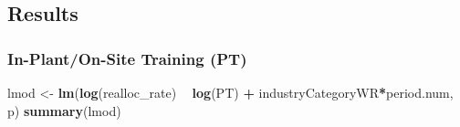 \documentclass[
]{article}
\newenvironment{Shaded}{\begin{snugshade}}{\end{snugshade}}
\newcommand{\KeywordTok}[1]{\textcolor[rgb]{0.13,0.29,0.53}{\textbf{#1}}}
\newcommand{\NormalTok}[1]{#1}
\newcommand{\OperatorTok}[1]{\textcolor[rgb]{0.81,0.36,0.00}{\textbf{#1}}}
\newcommand{\StringTok}[1]{\textcolor[rgb]{0.31,0.60,0.02}{#1}}
\begin{document}
\hypertarget{results-1}{%
\subsection{Results}\label{results-1}}

\hypertarget{in-planton-site-training-pt-1}{%
\subsubsection{In-Plant/On-Site Training
(PT)}\label{in-planton-site-training-pt-1}}

\begin{Shaded}
\begin{Highlighting}[]
\NormalTok{lmod <-}\StringTok{ }\KeywordTok{lm}\NormalTok{(}\KeywordTok{log}\NormalTok{(realloc_rate) }\OperatorTok{~}\StringTok{ }\KeywordTok{log}\NormalTok{(PT) }\OperatorTok{+}\StringTok{ }\NormalTok{industryCategoryWR}\OperatorTok{*}\NormalTok{period.num, p)}
\KeywordTok{summary}\NormalTok{(lmod)}
\end{Highlighting}
\end{Shaded}
\end{document}
